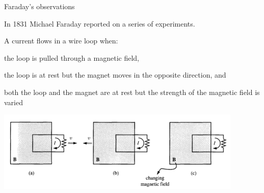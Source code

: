 \begin{frame}{Faraday's observations}

In 1831 Michael Faraday reported on a series of experiments.\\
\vspace{0.2cm}

A current flows in a wire loop when:
\vspace{0.2cm}
\begin{enumerate}[(a)]
{\small
  \item the loop is pulled through a magnetic field,
  \item the loop is at rest but the magnet moves in the opposite direction, and
  \item both the loop and the magnet are at rest but the strength of the magnetic field is varied
}
\end{enumerate}

\begin{center}
  \includegraphics[width=0.88\textwidth]{./images/schematics/faraday_law_schematic.png}
\end{center}

\end{frame}


%
%
%

